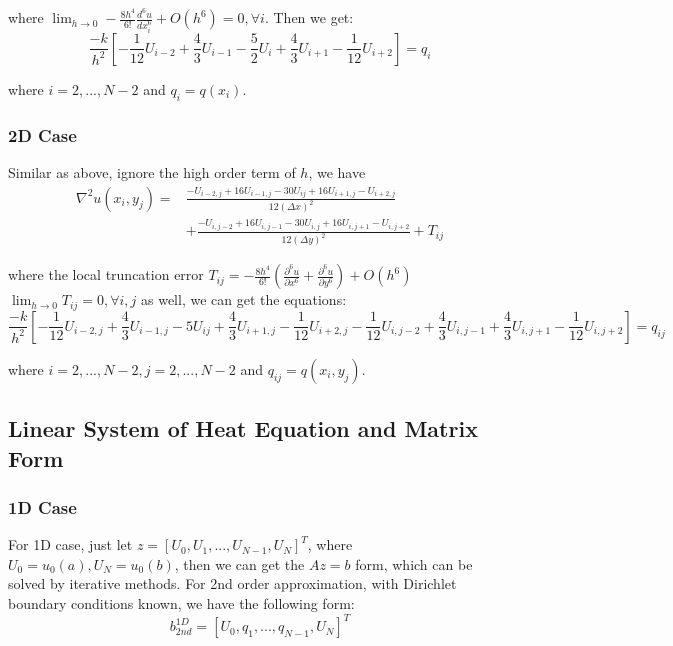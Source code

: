 \documentclass[a4paper]{article}
\begin{document}
where $\lim_{h\rightarrow 0} -\frac{8h^4}{6!}\frac{d^6 u}{d x_i^6}  + O(h^6) = 0, \forall i$. Then we get:
\begin{equation}
    \frac{-k}{h^2}[ -\frac{1}{12}U_{i-2} + \frac{4}{3}U_{i-1} - \frac{5}{2}U_{i} + \frac{4}{3}U_{i+1} - \frac{1}{12}U_{i+2}] = q_{i}
\end{equation}

where $ i = 2,...,N-2$ and $q_{i} = q(x_i)$. 

\subsubsection{2D Case}
Similar as above, ignore the high order term of $h$, we have 
\begin{equation}
    \begin{split}
    \nabla^2 u(x_i, y_j) =  & \frac{-U_{i-2,j} + 16U_{i-1,j} - 30U_{ij} + 16 U_{i+1,j} - U_{i+2,j}}{12(\Delta x)^2}\\
    & + \frac{-U_{i,j-2} + 16 U_{i,j-1} - 30 U_{i,j} + 16U_{i,j+1} -U_{i, j+2} }{12(\Delta y)^2}  + T_{ij}
    \end{split}
\end{equation}

where the local truncation error $T_{ij} = -\frac{8h^4}{6!}(\frac{\partial^6 u}{\partial x^6} + \frac{\partial^6 u}{\partial y^6}) + O(h^6) $ $\lim_{h\rightarrow 0} T_{ij} = 0, \forall i,j$ as well, we can get the equations:
\begin{equation}
    \frac{-k}{h^2}[ -\frac{1}{12}U_{i-2,j} + \frac{4}{3}U_{i-1,j} - 5U_{ij} + \frac{4}{3} U_{i+1,j} - \frac{1}{12}U_{i+2,j} -\frac{1}{12}U_{i,j-2} + \frac{4}{3} U_{i,j-1} + \frac{4}{3}U_{i,j+1} -\frac{1}{12}U_{i, j+2}] = q_{ij}
\end{equation}

where $ i = 2,...,N-2, j = 2,...,N-2$ and $q_{ij} = q(x_i,y_j)$.

\subsection{Linear System of Heat Equation and Matrix Form}
\subsubsection{1D Case}
For 1D case, just let $z=[U_0, U_1,...,U_{N-1},U_N]^T$, where $U_0=u_0(a), U_N=u_0(b)$, then we can get the $Az = b$ form, which can be solved by iterative methods. For 2nd order approximation, with Dirichlet boundary conditions known, we have the following form:
$$b_{2nd}^{1D} = [ U_0, q_1,...,q_{N-1}, U_N ]^T$$
\end{document}
